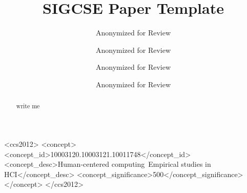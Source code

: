 \documentclass[sigconf,screen,review]{acmart}
\begin{document}
\title[Template]{SIGCSE Paper Template}


\author{Anonymized for Review}

\author{Anonymized for Review}

\author{Anonymized for Review}

\author{Anonymized for Review}



\begin{abstract}
  write me
\end{abstract}

\begin{CCSXML}
  <ccs2012>
  <concept>
  <concept_id>10003120.10003121.10011748</concept_id>
  <concept_desc>Human-centered computing~Empirical studies in HCI</concept_desc>
  <concept_significance>500</concept_significance>
  </concept>
  </ccs2012>
\end{CCSXML}




\maketitle
\end{document}
